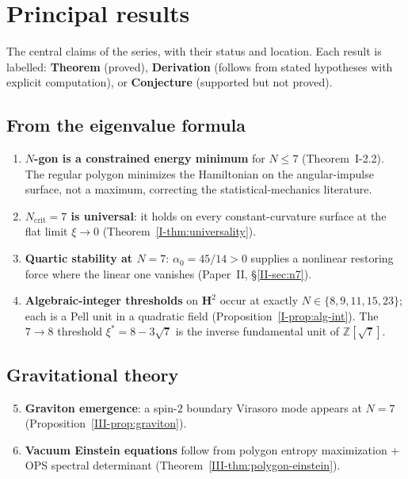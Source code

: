 \section{Principal results}
\label{sec:results}

The central claims of the series, with their status
and location.  Each result is labelled:
\textbf{Theorem} (proved), \textbf{Derivation} (follows from
stated hypotheses with explicit computation), or
\textbf{Conjecture} (supported but not proved).

\subsection{From the eigenvalue formula}

\begin{enumerate}
\item \textbf{$N$-gon is a constrained energy minimum}
  for $N \le 7$ (Theorem~I-2.2).
  The regular polygon minimizes the Hamiltonian on the
  angular-impulse surface, not a maximum, correcting the
  statistical-mechanics literature.

\item \textbf{$N_{\mathrm{crit}} = 7$ is universal}:
  it holds on every constant-curvature surface at the
  flat limit $\xi \to 0$ (Theorem~\ref*{I-thm:universality}).

\item \textbf{Quartic stability at $N = 7$}:
  $\alpha_0 = 45/14 > 0$ supplies a nonlinear restoring
  force where the linear one vanishes
  (Paper~II, \S\ref*{II-sec:n7}).

\item \textbf{Algebraic-integer thresholds} on $\mathbf{H}^2$
  occur at exactly $N \in \{8, 9, 11, 15, 23\}$;
  each is a Pell unit in a quadratic field
  (Proposition~\ref*{I-prop:alg-int}).
  The $7 \to 8$ threshold $\xi^* = 8-3\sqrt{7}$
  is the inverse fundamental unit of $\mathbb{Z}[\sqrt{7}]$.
\end{enumerate}

\subsection{Gravitational theory}

\begin{enumerate}\setcounter{enumi}{4}
\item \textbf{Graviton emergence}: a spin-$2$ boundary
  Virasoro mode appears at $N = 7$
  (Proposition~\ref*{III-prop:graviton}).

\item \textbf{Vacuum Einstein equations} follow from polygon
  entropy maximization + OPS spectral determinant
  (Theorem~\ref*{III-thm:polygon-einstein}).
\end{enumerate}

